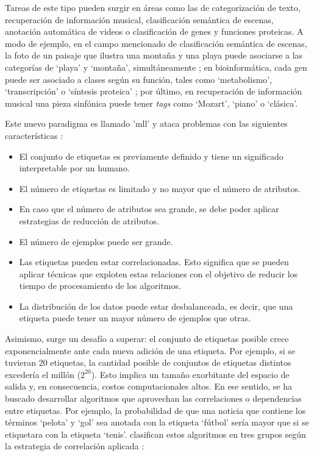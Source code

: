 Tareas de este tipo pueden surgir en áreas como las de categorización de texto,
recuperación de información musical, clasificación semántica de escenas,
anotación automática de videos o  clasificación de genes y funciones proteicas.
A modo de ejemplo, en el campo mencionado de clasificación semántica de escenas,
la foto de un paisaje que ilustra una montaña y una playa puede asociarse a las
categorías de ‘playa’ y ‘montaña’, simultáneamente \cite{gibaja_tutorial_2015};
en bioinformática, cada gen puede ser asociado a clases según su función, tales
como ‘metabolismo’, ‘transcripción’ o ‘síntesis proteica’
\cite{zhang_multi-label_2010}; por último, en recuperación de información
musical una pieza sinfónica puede tener \textit{tags} como ‘Mozart’, ‘piano’ o
‘clásica’.

Este nuevo paradigma es llamado '\acrlong{mll}'   y ataca problemas con las
siguientes características \cite{gibaja_tutorial_2015}: 

\begin{itemize} 

   \item El conjunto de etiquetas es previamente definido y tiene un significado
      interpretable por un humano.  

   \item El número de etiquetas es limitado y no mayor que el número de
      atributos. 

   \item En caso que el número de atributos sea grande, se debe poder aplicar
      estrategias de reducción de atributos.

   \item El número de ejemplos puede ser grande.  

   \item Las etiquetas pueden estar correlacionadas. Esto significa que se
      pueden aplicar técnicas que exploten estas relaciones con el objetivo de
      reducir los tiempo de procesamiento de los algoritmos.  

   \item La distribución de los datos puede estar desbalanceada, es decir, que
      una etiqueta puede tener un mayor número de ejemplos que otras. 

\end{itemize}

Asimismo, surge un desafío a superar: el conjunto de etiquetas posible crece
exponencialmente ante cada nueva adición de una etiqueta. Por ejemplo, si se
tuvieran 20 etiquetas, la cantidad posible de conjuntos de etiquetas distintos
excedería el millón (\(2^{20}\)). Esto implica un tamaño exorbitante del espacio
de salida y, en consecuencia, costos computacionales altos. En ese sentido, se
ha buscado desarrollar algoritmos que aprovechan las correlaciones o
dependencias entre etiquetas. Por ejemplo, la probabilidad de que una noticia
que contiene los términos ‘pelota’ y ‘gol’ sea anotada con la etiqueta ‘fútbol’
sería mayor que si se etiquetara con la etiqueta ‘tenis’.
\citeauthor{zhang_multi-label_2010} clasifican estos algoritmos en tres grupos
según la estrategia de correlación aplicada \cite{zhang_multi-label_2010}:

